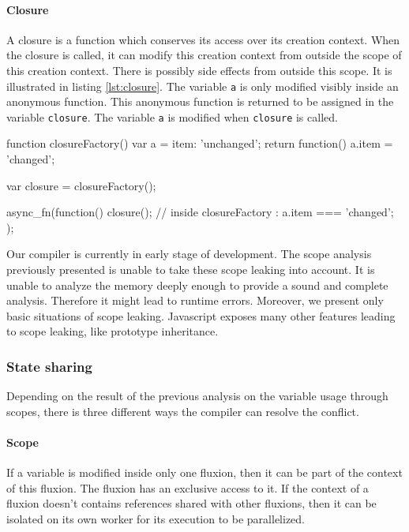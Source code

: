 \paragraph{Closure}

A closure is a function which conserves its access over its creation context.
When the closure is called, it can modify this creation context from outside the scope of this creation context.
There is possibly side effects from outside this scope.
It is illustrated in listing \ref{lst:closure}.
The variable \texttt{a} is only modified visibly inside an anonymous function.
This anonymous function is returned to be assigned in the variable \texttt{closure}.
The variable \texttt{a} is modified when \texttt{closure} is called.

\begin{code}[js, caption={Example of a scope leak due to a closure},label={lst:closure}]
function closureFactory() {
  var a = {item: 'unchanged'};
  return function() {
    a.item = 'changed';
  }
}

var closure = closureFactory();

async_fn(function() {
  closure();
  // inside closureFactory : a.item === 'changed';
});
\end{code}

Our compiler is currently in early stage of development.
The scope analysis previously presented is unable to take these scope leaking into account.
It is unable to analyze the memory deeply enough to provide a sound and complete analysis.
Therefore it might lead to runtime errors.
Moreover, we present only basic situations of scope leaking.
Javascript exposes many other features leading to scope leaking, like prototype inheritance.

\subsubsection{State sharing}

Depending on the result of the previous analysis on the variable usage through scopes, there is three different ways the compiler can resolve the conflict.


\paragraph{Scope}
If a variable is modified inside only one fluxion, then it can be part of the context of this fluxion.
The fluxion has an exclusive access to it.
If the context of a fluxion doesn't contains references shared with other fluxions, then it can be isolated on its own worker for its execution to be parallelized.

